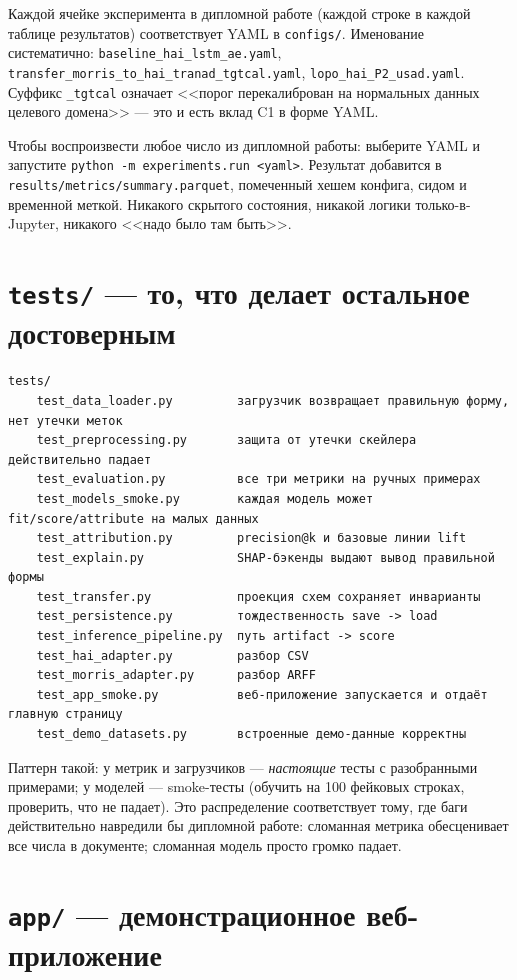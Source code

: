 \documentclass[11pt,a4paper]{article}
\newcommand{\code}[1]{\texttt{#1}}
\begin{document}
Каждой ячейке эксперимента в дипломной работе (каждой строке в каждой таблице результатов) соответствует YAML в \code{configs/}. Именование систематично: \code{baseline\_hai\_lstm\_ae.yaml}, \code{transfer\_morris\_to\_hai\_tranad\_tgtcal.yaml}, \code{lopo\_hai\_P2\_usad.yaml}. Суффикс \code{\_tgtcal} означает <<порог перекалиброван на нормальных данных целевого домена>> --- это и есть вклад C1 в форме YAML.

Чтобы воспроизвести любое число из дипломной работы: выберите YAML и запустите \code{python -m experiments.run <yaml>}. Результат добавится в \code{results/metrics/summary.parquet}, помеченный хешем конфига, сидом и временной меткой. Никакого скрытого состояния, никакой логики только-в-Jupyter, никакого <<надо было там быть>>.

\section{\texttt{tests/} --- то, что делает остальное достоверным}

\begin{Verbatim}
tests/
    test_data_loader.py         загрузчик возвращает правильную форму, нет утечки меток
    test_preprocessing.py       защита от утечки скейлера действительно падает
    test_evaluation.py          все три метрики на ручных примерах
    test_models_smoke.py        каждая модель может fit/score/attribute на малых данных
    test_attribution.py         precision@k и базовые линии lift
    test_explain.py             SHAP-бэкенды выдают вывод правильной формы
    test_transfer.py            проекция схем сохраняет инварианты
    test_persistence.py         тождественность save -> load
    test_inference_pipeline.py  путь artifact -> score
    test_hai_adapter.py         разбор CSV
    test_morris_adapter.py      разбор ARFF
    test_app_smoke.py           веб-приложение запускается и отдаёт главную страницу
    test_demo_datasets.py       встроенные демо-данные корректны
\end{Verbatim}

Паттерн такой: у метрик и загрузчиков --- \emph{настоящие} тесты с разобранными примерами; у моделей --- smoke-тесты (обучить на 100 фейковых строках, проверить, что не падает). Это распределение соответствует тому, где баги действительно навредили бы дипломной работе: сломанная метрика обесценивает все числа в документе; сломанная модель просто громко падает.

\section{\texttt{app/} --- демонстрационное веб-приложение}
\end{document}
